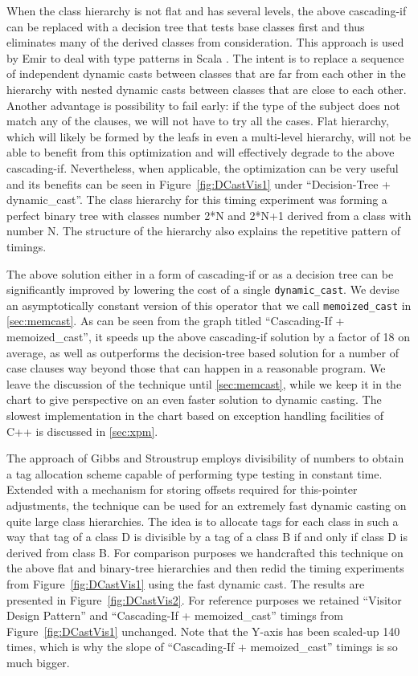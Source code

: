 \documentclass[preprint]{sigplanconf}
\makeatletter
\DeclareRobustCommand{\code}[1]{{\lstinline[breaklines=false,escapechar=@]{#1}}}
\makeatother
\begin{document}
When the class hierarchy is not flat and has several levels, the above 
cascading-if can be replaced with a decision tree that tests base classes first 
and thus eliminates many of the derived classes from consideration. This 
approach is used by Emir to deal with type patterns in Scala
\cite[]{EmirThesis}. The intent is to replace a sequence of 
independent dynamic casts between classes that are far from each other in the 
hierarchy with nested dynamic casts between classes that are close to each 
other. Another advantage is possibility to fail early: if the type of the subject 
does not match any of the clauses, we will not have to try all the cases. 
Flat hierarchy, which will likely be formed by the leafs in even a multi-level 
hierarchy, will not be able to benefit from this optimization and 
will effectively degrade to the above cascading-if. Nevertheless, when 
applicable, the optimization can be very useful and its benefits can be seen in
Figure~\ref{fig:DCastVis1} under ``Decision-Tree + dynamic\_cast''. The class 
hierarchy for this timing experiment was forming a perfect binary tree with 
classes number 2*N and 2*N+1 derived from a class with number N. The structure 
of the hierarchy also explains the repetitive pattern of timings.

The above solution either in a form of cascading-if or as a decision tree can be 
significantly improved by lowering the cost of a single \code{dynamic_cast}. 
We devise an asymptotically constant version of this operator that we call
\code{memoized_cast} in \textsection\ref{sec:memcast}. As can be seen from the graph 
titled ``Cascading-If + memoized\_cast'', it speeds up the above cascading-if 
solution by a factor of 18 on average, as well as outperforms the decision-tree 
based solution for a number of case clauses way beyond those that can happen in 
a reasonable program. We leave the discussion of the technique until 
\textsection\ref{sec:memcast}, while we keep it in the chart to give perspective on 
an even faster solution to dynamic casting. The slowest implementation in the 
chart based on exception handling facilities of C++ is discussed in 
\textsection\ref{sec:xpm}.

The approach of Gibbs and Stroustrup employs divisibility of numbers to obtain a 
tag allocation scheme capable of performing type testing in constant time. 
Extended with a mechanism for storing offsets required for this-pointer 
adjustments, the technique can be used for an extremely fast dynamic casting on 
quite large class hierarchies\cite{FastDynCast}. The idea is to allocate tags 
for each class in such a way that tag of a class D is divisible by a tag of a 
class B if and only if class D is derived from class B. For comparison purposes 
we handcrafted this technique on the above flat and binary-tree hierarchies and 
then redid the timing experiments from Figure~\ref{fig:DCastVis1} using the fast 
dynamic cast. The results are presented in Figure~\ref{fig:DCastVis2}. For 
reference purposes we retained ``Visitor Design Pattern'' and ``Cascading-If + 
memoized\_cast'' timings from Figure~\ref{fig:DCastVis1} unchanged. Note that 
the Y-axis has been scaled-up 140 times, which is why the slope of 
``Cascading-If + memoized\_cast'' timings is so much bigger.
\end{document}
